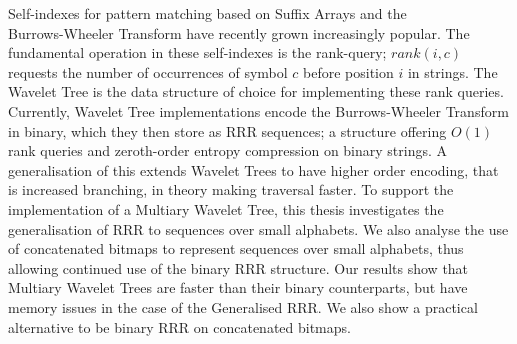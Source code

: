 Self-indexes for pattern matching based on Suffix
Arrays and the \\ Burrows-Wheeler Transform have recently grown increasingly 
popular.
The fundamental operation in these self-indexes is the rank-query; $rank(i, c)$ 
requests the 
number of occurrences of symbol $c$ before position $i$ in strings. The Wavelet 
Tree is the data structure of choice for implementing these rank queries. 
Currently, Wavelet Tree implementations encode the Burrows-Wheeler Transform in 
binary, which they then store as RRR sequences;
a structure offering $O(1)$ rank queries and zeroth-order entropy compression on 
binary strings. A generalisation of this extends Wavelet Trees to have higher 
order encoding, that is increased branching, in theory making traversal faster. 
To support the implementation of a Multiary
Wavelet Tree, this thesis investigates the generalisation of RRR to sequences 
over small alphabets. We also analyse the use of concatenated bitmaps to 
represent sequences over small alphabets, thus allowing continued use of the
binary RRR structure. Our results show that Multiary Wavelet Trees are faster
than their binary counterparts, but have memory issues in the case of the
Generalised RRR. We also show a practical alternative to be binary RRR on concatenated bitmaps.